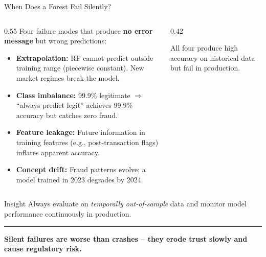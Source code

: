 \documentclass[8pt,aspectratio=169]{beamer}
\newcommand{\bottomnote}[1]{%
\vfill
\vspace{-2mm}
\textcolor{mllavender2}{\rule{\textwidth}{0.4pt}}
\vspace{1mm}
\footnotesize
\textbf{#1}
}
\newenvironment{compactlist}{%
  \begin{itemize}%
    \setlength{\itemsep}{2pt}%
    \setlength{\parskip}{0pt}%
    \setlength{\parsep}{0pt}%
}{%
  \end{itemize}%
}
\newcommand{\highlight}[1]{\textcolor{mlorange}{\textbf{#1}}}
\begin{document}

\begin{frame}{When Does a Forest Fail Silently?}
\begin{columns}[T]
\begin{column}{0.55\textwidth}
\small
Four failure modes that produce \highlight{no error message} but wrong predictions:

\vspace{0.3em}
\footnotesize
\begin{compactlist}
\item \textbf{Extrapolation:} RF cannot predict outside training range (piecewise constant). New market regimes break the model.
\item \textbf{Class imbalance:} 99.9\% legitimate $\Rightarrow$ ``always predict legit'' achieves 99.9\% accuracy but catches zero fraud.
\item \textbf{Feature leakage:} Future information in training features (e.g., post-transaction flags) inflates apparent accuracy.
\item \textbf{Concept drift:} Fraud patterns evolve; a model trained in 2023 degrades by 2024.
\end{compactlist}
\end{column}
\begin{column}{0.42\textwidth}
\scriptsize
{}

\vspace{0.5em}
\scriptsize All four produce high accuracy on historical data but fail in production.
\end{column}
\end{columns}

\begin{block}{Insight}
\scriptsize Always evaluate on \emph{temporally out-of-sample} data and monitor model performance continuously in production.
\end{block}
\bottomnote{Silent failures are worse than crashes -- they erode trust slowly and cause regulatory risk.}
\end{frame}
\end{document}
